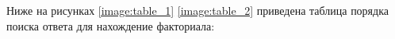Ниже на рисунках \ref{image:table_1} \ref{image:table_2} приведена таблица порядка поиска ответа для нахождение факториала:
\begin{figure}[H]
\end{figure}

